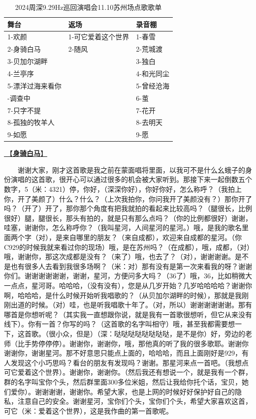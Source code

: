 \documentclass[]{ctexbook}
\begin{document}
\begin{table}

\caption{\label{tab:unnamed-chunk-114}2024周深9.29Hz巡回演唱会11.10苏州场点歌歌单}
\centering
\begin{tabular}[t]{lll}
\toprule
舞台 & 返场 & 录音棚\\
\midrule
1-欢颜 & 1-可它爱着这个世界 & 1-春雪\\
2-身骑白马 & 2-随风 & 2-荒城渡\\
3-贝加尔湖畔 &  & 3-独白\\
4-兰亭序 &  & 4-和光同尘\\
5-漂洋过海来看你 &  & 5-曾经沧海\\
\addlinespace
6-调查中 &  & 6-茧\\
7-只字不提 &  & 7-花开\\
8-孤独的牧羊人 &  & 8-去明天\\
9-如愿 &  & 9-愿\\
\bottomrule
\end{tabular}
\end{table}

\hyperref[on-the-white-horse]{🎵【\textbf{身骑白马}】}

  谢谢大家，刚才这首歌是我之前在蒙面唱将里面，以我可不是什么幺蛾子的身份演唱的这首歌，很开心可以通过很多的机会被大家听到。那接下来一起倒数五个数字，5（米：4321）停，你好，（深深你好），你好你好，怎么称呼？（我拍上你，开了美颜了）什么？什么？（上次我拍你，你问我开了美颜没有？）那你开了吗？（开了）开了，那你那个角度有把我就拍的看起来比较高吗？（腿很长，比例很好）腿，腿很长，那头有拍的，就是只有那么点吗？（你的比例都很好）谢谢，哇塞，谢谢你，怎么称呼你？（我叫星河，人间星河的星河。）哦，是我的歌名里面两个字（对），是来自哪里的朋友？（来自成都），欢迎来自成都的星河。（你C929的时候我就来看过你的现场）哦，是在苏州吗？（在成都），哦，成都，（对）哦，谢谢你，那这次成都是没有？（来了）哦，也去了？（对），谢谢谢谢。是不是也有很多人去看到我很多场啊？（米：对）那有没有是第一次来看我的呀？谢谢你们。谢谢谢谢谢谢，谢谢，星河，方便问多大吗？（36了）哦，36，比如稍微大一点点，星河哥。哈哈哈，（没有没有），您是从几岁开始？几岁哈哈哈哈？谢谢你啊，哈哈哈，是什么时候开始听我唱歌的？（从贝加尔湖畔的时候），那就是我刚刚出道的时候。（对）哇，也是听我唱歌十年了。（对，所以）谢谢谢谢谢谢。那有哪首是你想听呢？（其实我一直想跟你说，就是我有一首歌很想听，但它从来没有线下）。你有一首？你写的吗？（这首歌的名字叫相守）哦，甚至我都需要想一下，这首歌。（很小众，但是）（深：哒哒哒哒哒哒哒哒，是不是你）好，旁边的老师（比手势停停停）。谢谢你，谢谢你，哦，那他真的听了我的很多歌耶。谢谢你谢谢你，谢谢星河。那不好意思只能点上面的，哈哈哈，而且上面刚好是929，有人发现这个小巧思吗？看台的朋友有发现吗？谢谢。那星河来点一首吧。（我想点可它爱着这个世界）。谢谢你，谢谢你。（然后我还有想说一个，就是我有一个群，群的名字叫宝你个头，然后群里面300多位米姐，然后让我给你托个话，宝贝，她们爱你）。谢谢谢谢，谢谢你。希望大家，也是上网的时候好好保护好自己的隐私，注意自己的安全。谢谢星河，宝你们个头，宝你们个头，希望大家喜欢这首，可它（米：爱着这个世界），这是我作曲的第一首歌呢。
\end{document}
